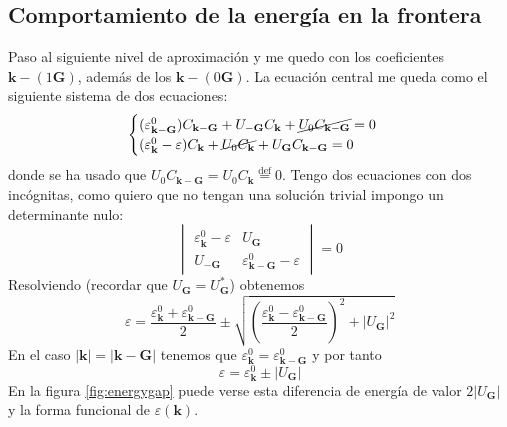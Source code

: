 \subsection{Comportamiento de la energía en la frontera}
Paso al siguiente nivel de aproximación y me quedo con los
coeficientes $\mathbf{k}-(1\mathbf{G})$, además de los
$\mathbf{k}- (0 \mathbf{G})$. La ecuación central me queda como el
siguiente sistema de dos ecuaciones:
\begin{equation}
  \begin{cases}
    (\varepsilon^0_{\mathbf{k}-\mathbf{G}})C_{\mathbf{k}-\mathbf{G}} +
    U_{-\mathbf{G}}C_\mathbf{k} + \cancel{U_0
      C_{\mathbf{k}-\mathbf{G}}} = 0 \\
    (\varepsilon_\mathbf{k}^0-\varepsilon)C_\mathbf{k} +
    \cancel{U_0 C_\mathbf{k}} +
    U_\mathbf{G}C_{\mathbf{k}-\mathbf{G}} = 0
  \end{cases}
\end{equation}
donde se ha usado que $U_0 C_{\mathbf{k}-\mathbf{G}} = U_0
C_\mathbf{k} \stackrel{\text{def}}{=} 0$. Tengo dos ecuaciones con dos
incógnitas, como quiero que no tengan una
solución trivial impongo un determinante nulo:
\begin{equation}
  \begin{vmatrix}
    \varepsilon_\mathbf{k}^0 - \varepsilon & U_\mathbf{G} \\
    U_{-\mathbf{G}} & \varepsilon_{\mathbf{k}-\mathbf{G}}^0 - \varepsilon
  \end{vmatrix} = 0
\end{equation}
Resolviendo (recordar que $U_\mathbf{G} = U_\mathbf{G}^*$) obtenemos
\begin{equation}
  \varepsilon = \frac{\varepsilon_\mathbf{k}^0 +
    \varepsilon_{\mathbf{k}-\mathbf{G}}^0}{2} \pm \sqrt{\left(
      \frac{\varepsilon_\mathbf{k}^0 -
        \varepsilon_{\mathbf{k}-\mathbf{G}}^0}{2} \right)^2 + |U_\mathbf{G}|^2}
\end{equation}
En el caso $|\mathbf{k}| = |\mathbf{k}-\mathbf{G}|$ tenemos que
$\varepsilon_\mathbf{k}^0 = \varepsilon_{\mathbf{k}-\mathbf{G}}^0$ y
por tanto
\begin{equation}
  \varepsilon = \varepsilon_\mathbf{k}^0 \pm |U_\mathbf{G}|
\end{equation}
En la figura \ref{fig:energygap} puede verse esta diferencia de
energía de valor $2|U_\mathbf{G}|$ y la forma funcional de $\varepsilon(\mathbf{k})$.
